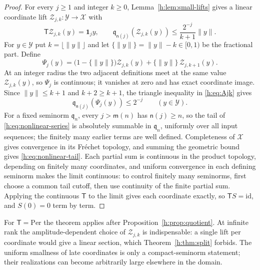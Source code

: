 \documentclass[11pt,a4paper]{article}
\numberwithin{equation}{section}
\theoremstyle{definition}
\theoremstyle{remark}
\theoremstyle{plain}
\newcommand{\Per}{\mathrm{Per}}
\newcommand{\norm}[1]{\lVert #1\rVert}
\begin{document}
\begin{proof}
For every $j\ge1$ and integer $k\ge0$, Lemma~\ref{h:lem:small-lifts} gives a
linear coordinate lift $\mathcal Z_{j,k}:\mathcal Y\to\mathcal X$ with
\begin{equation}\label{h:eq:Ajk}
 \mathsf T\mathcal Z_{j,k}(y)=\mathbf 1_jy,\qquad
 \mathfrak q_{\mathsf n(j)}(\mathcal Z_{j,k}(y))\le\frac{2^{-j}}{k+1}\norm y .
\end{equation}
For $y\in\mathcal Y$ put $k=\lfloor\norm y\rfloor$ and let
$\{\norm y\}=\norm y-k\in[0,1)$ be the fractional part. Define
\begin{equation}\label{h:eq:Phi}
 \Psi_j(y)=\bigl(1-\{\norm y\}\bigr)\mathcal Z_{j,k}(y)
 +\{\norm y\}\,\mathcal Z_{j,k+1}(y).
\end{equation}
At an integer radius the two adjacent definitions meet at the same value
$\mathcal Z_{j,k}(y)$, so $\Psi_j$ is continuous; it vanishes at zero and has
exact coordinate image. Since $\norm y\le k+1$ and $k+2\ge k+1$, the triangle
inequality in \eqref{h:eq:Ajk} gives
\begin{equation}\label{h:eq:uniform-small}
 \mathfrak q_{\mathsf n(j)}(\Psi_j(y))\le2^{-j}\qquad(y\in\mathcal Y).
\end{equation}
For a fixed seminorm $\mathfrak q_n$, every $j>\mathsf m(n)$ has
$\mathsf n(j)\ge n$, so the tail of \eqref{h:eq:nonlinear-series} is absolutely
summable in $\mathfrak q_n$, uniformly over all input sequences; the finitely
many earlier terms are well defined. Completeness of $\mathcal X$ gives
convergence in its Fr\'echet topology, and summing the geometric bound gives
\eqref{h:eq:nonlinear-tail}. Each partial sum is continuous in the product
topology, depending on finitely many coordinates, and uniform convergence in
each defining seminorm makes the limit continuous: to control finitely many
seminorms, first choose a common tail cutoff, then use continuity of the finite
partial sum. Applying the continuous $\mathsf T$ to the limit gives each
coordinate exactly, so $\mathsf TS=\mathrm{id}$, and $S(0)=0$ term by term.
\end{proof}

For $\mathsf T=\Per$ the theorem applies after Proposition~\ref{h:prop:quotient}.
At infinite rank the amplitude-dependent choice of $\mathcal Z_{j,k}$ is
indispensable: a single lift per coordinate would give a linear section, which
Theorem~\ref{h:thm:split} forbids. The uniform smallness of late coordinates is
only a compact-seminorm statement; their realizations can become arbitrarily
large elsewhere in the domain.
\end{document}
